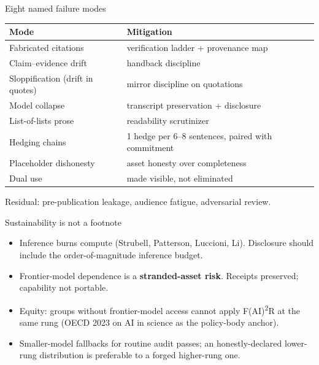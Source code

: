 \documentclass[aspectratio=169,11pt]{beamer}
\begin{document}
\begin{frame}{Eight named failure modes}
  \footnotesize
  \begin{tabular}{p{4.4cm}p{6.6cm}}
    \toprule
    Mode & Mitigation \\
    \midrule
    Fabricated citations          & verification ladder + provenance map \\
    Claim--evidence drift         & handback discipline \\
    Sloppification (drift in quotes) & mirror discipline on quotations \\
    Model collapse                & transcript preservation + disclosure \\
    List-of-lists prose           & readability scrutinizer \\
    Hedging chains                & 1 hedge per 6--8 sentences, paired with commitment \\
    Placeholder dishonesty        & asset honesty over completeness \\
    Dual use                      & made visible, not eliminated \\
    \bottomrule
  \end{tabular}

  \vspace{0.4em}
  \normalsize
  Residual: pre-publication leakage, audience fatigue, adversarial review.
\end{frame}

\begin{frame}{Sustainability is not a footnote}
  \begin{itemize}
    \item Inference burns compute (Strubell, Patterson, Luccioni, Li). Disclosure should include the order-of-magnitude inference budget.
    \item Frontier-model dependence is a \textbf{stranded-asset risk}. Receipts preserved; capability not portable.
    \item Equity: groups without frontier-model access cannot apply F(AI)\textsuperscript{2}R at the same rung (OECD 2023 on AI in science as the policy-body anchor).
    \item Smaller-model fallbacks for routine audit passes; an honestly-declared lower-rung distribution is preferable to a forged higher-rung one.
  \end{itemize}
\end{frame}

\end{document}
